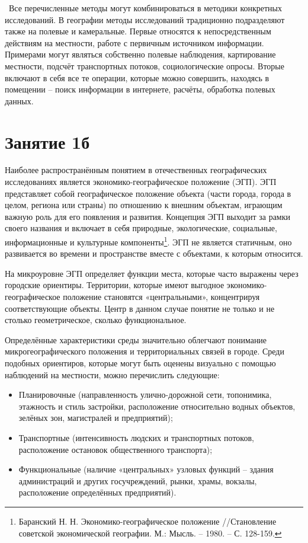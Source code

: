 \documentclass[
  11pt,
]{book}
\begin{document}
~Все перечисленные методы могут комбинироваться в методики конкретных исследований. В географии методы исследований традиционно подразделяют также на полевые и камеральные. Первые относятся к непосредственным действиям на местности, работе с первичным источником информации. Примерами могут являться собственно полевые наблюдения, картирование местности, подсчёт транспортных потоков, социологические опросы. Вторые включают в себя все те операции, которые можно совершить, находясь в помещении -- поиск информации в интернете, расчёты, обработка полевых данных.

\section*{Занятие 1б}\label{ux437ux430ux43dux44fux442ux438ux435-1ux431}

Наиболее распространённым понятием в отечественных географических исследованиях является экономико-географическое положение (ЭГП). ЭГП представляет собой географическое положение объекта (части города, города в целом, региона или страны) по отношению к внешним объектам, играющим важную роль для его появления и развития. Концепция ЭГП выходит за рамки своего названия и включает в себя природные, экологические, социальные, информационные и культурные компоненты\footnote{Баранский Н. Н. Экономико-географическое положение //Становление советской экономической географии. М.: Мысль. -- 1980. -- С. 128-159.}. ЭГП не является статичным, оно развивается во времени и пространстве вместе с объектами, к которым относится.

На микроуровне ЭГП определяет функции места, которые часто выражены через городские ориентиры. Территории, которые имеют выгодное экономико-географическое положение становятся «центральными», концентрируя соответствующие объекты. Центр в данном случае понятие не только и не столько геометрическое, сколько функциональное.

Определённые характеристики среды значительно облегчают понимание микрогеографического положения и территориальных связей в городе. Среди подобных ориентиров, которые могут быть оценены визуально с помощью наблюдений на местности, можно перечислить следующие:

\begin{itemize}
\item
  Планировочные (направленность улично-дорожной сети, топонимика, этажность и стиль застройки, расположение относительно водных объектов, зелёных зон, магистралей и предприятий);
\item
  Транспортные (интенсивность людских и транспортных потоков, расположение остановок общественного транспорта);
\item
  Функциональные (наличие «центральных» узловых функций -- здания администраций и других госучреждений, рынки, храмы, вокзалы, расположение определённых предприятий).
\end{itemize}
\end{document}
